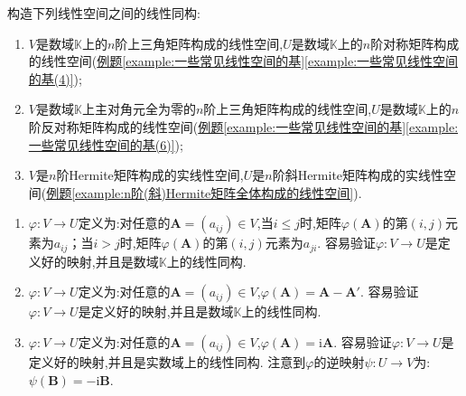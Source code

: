 \documentclass[../../main.tex]{subfiles}
\begin{document}
\begin{exercise}
构造下列线性空间之间的线性同构:
\begin{enumerate}[(1)]
\item \(V\)是数域\(\mathbb{K}\)上的\(n\)阶上三角矩阵构成的线性空间,\(U\)是数域\(\mathbb{K}\)上的\(n\)阶对称矩阵构成的线性空间(\hyperref[example:一些常见线性空间的基(4)]{例题\ref{example:一些常见线性空间的基}\ref{example:一些常见线性空间的基(4)}});
\item \(V\)是数域\(\mathbb{K}\)上主对角元全为零的\(n\)阶上三角矩阵构成的线性空间,\(U\)是数域\(\mathbb{K}\)上的\(n\)阶反对称矩阵构成的线性空间(\hyperref[example:一些常见线性空间的基(6)]{例题\ref{example:一些常见线性空间的基}\ref{example:一些常见线性空间的基(6)}});
\item \(V\)是\(n\)阶Hermite矩阵构成的实线性空间,\(U\)是\(n\)阶斜Hermite矩阵构成的实线性空间(\hyperref[example:n阶(斜)Hermite矩阵全体构成的线性空间]{例题\ref{example:n阶(斜)Hermite矩阵全体构成的线性空间}}).
\end{enumerate}
\end{exercise}
\begin{solution}
\begin{enumerate}[(1)]
\item  \(\varphi:V\to U\)定义为:对任意的\(\boldsymbol{A}=(a_{ij})\in V\),当\(i\leq j\)时,矩阵\(\varphi(\boldsymbol{A})\)的第\((i,j)\)元素为\(a_{ij}\)；当\(i > j\)时,矩阵\(\varphi(\boldsymbol{A})\)的第\((i,j)\)元素为\(a_{ji}\). 容易验证\(\varphi:V\to U\)是定义好的映射,并且是数域\(\mathbb{K}\)上的线性同构.
\item \(\varphi:V\to U\)定义为:对任意的\(\boldsymbol{A}=(a_{ij})\in V\),\(\varphi(\boldsymbol{A})=\boldsymbol{A}-\boldsymbol{A}'\). 容易验证\(\varphi:V\to U\)是定义好的映射,并且是数域\(\mathbb{K}\)上的线性同构.
\item \(\varphi:V\to U\)定义为:对任意的\(\boldsymbol{A}=(a_{ij})\in V\),\(\varphi(\boldsymbol{A})=\mathrm{i}\boldsymbol{A}\). 容易验证\(\varphi:V\to U\)是定义好的映射,并且是实数域上的线性同构. 注意到\(\varphi\)的逆映射\(\psi:U\to V\)为:\(\psi(\boldsymbol{B})=-\mathrm{i}\boldsymbol{B}\). 
\end{enumerate}
\end{solution}
\end{document}
